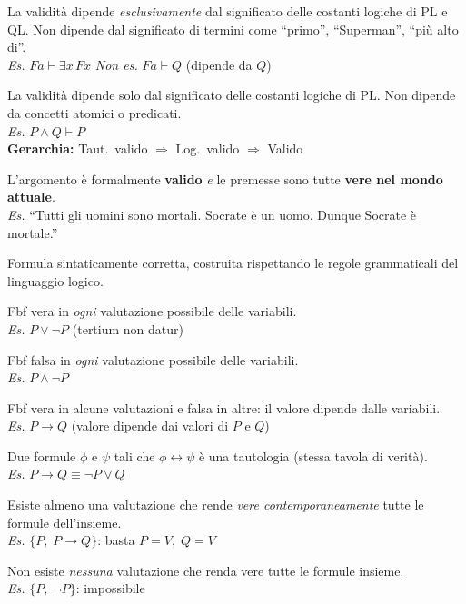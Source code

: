 \documentclass[10pt,a4paper]{article}
\begin{document}
{La validità dipende \emph{esclusivamente} dal significato delle costanti logiche di PL e QL.
Non dipende dal significato di termini come ``primo'', ``Superman'', ``più alto di''.\\
\textit{Es.} $Fa \vdash \exists x\,Fx$ \qquad \textit{Non es.} $Fa \vdash Q$ (dipende da $Q$)}

{La validità dipende solo dal significato delle costanti logiche di PL.
Non dipende da concetti atomici o predicati.\\
\textit{Es.} $P \land Q \vdash P$\\
\textbf{Gerarchia:} Taut.\ valido $\Rightarrow$ Log.\ valido $\Rightarrow$ Valido}

{L'argomento è formalmente \textbf{valido} \emph{e} le premesse sono tutte \textbf{vere nel mondo attuale}.\\
\textit{Es.} ``Tutti gli uomini sono mortali. Socrate è un uomo. Dunque Socrate è mortale.''}

{Formula sintaticamente corretta, costruita rispettando le regole grammaticali del linguaggio logico.}

{Fbf vera in \emph{ogni} valutazione possibile delle variabili.\\
\textit{Es.} $P \lor \lnot P$ \quad (tertium non datur)}

\newpage
{}
{Fbf falsa in \emph{ogni} valutazione possibile delle variabili.\\
\textit{Es.} $P \land \lnot P$}

{Fbf vera in alcune valutazioni e falsa in altre: il valore dipende dalle variabili.\\
\textit{Es.} $P \to Q$ (valore dipende dai valori di $P$ e $Q$)}

{Due formule $\phi$ e $\psi$ tali che $\phi \leftrightarrow \psi$ è una tautologia (stessa tavola di verità).\\
\textit{Es.} $P \to Q \equiv \lnot P \lor Q$}

{Esiste almeno una valutazione che rende \emph{vere contemporaneamente} tutte le formule dell'insieme.\\
\textit{Es.} $\{P,\; P \to Q\}$: basta $P{=}V,\; Q{=}V$}

{Non esiste \emph{nessuna} valutazione che renda vere tutte le formule insieme.\\
\textit{Es.} $\{P,\; \lnot P\}$: impossibile}
\end{document}
